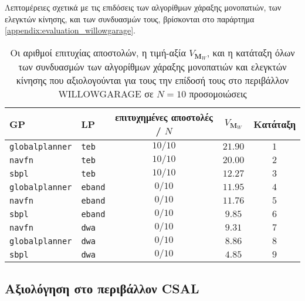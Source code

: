 Λεπτομέρειες σχετικά
με τις επιδόσεις των αλγορίθμων χάραξης μονοπατιών, των ελεγκτών κίνησης,
και των συνδυασμών τους, βρίσκονται στο παράρτημα
\ref{appendix:evaluation_willowgarage}.


\begin{table}[htb]\centering
\renewcommand{\arraystretch}{1.3}
\begin{tabular}{llccc}
  GP                     & LP             & επιτυχημένες αποστολές / $N$ & $V_{\bm{M}_W}$ & Κατάταξη \\ \toprule
  \texttt{globalplanner} & \texttt{teb}   & $10/10$                      & $21.90$        & $1$      \\
  \texttt{navfn}         & \texttt{teb}   & $10/10$                      & $20.00$        & $2$      \\
  \texttt{sbpl}          & \texttt{teb}   & $10/10$                      & $12.27$        & $3$      \\
  \texttt{globalplanner} & \texttt{eband} & $0/10$                       & $11.95$        & $4$      \\
  \texttt{navfn}         & \texttt{eband} & $0/10$                       & $11.76$        & $5$      \\
  \texttt{sbpl}          & \texttt{eband} & $0/10$                       & $9.85$         & $6$      \\
  \texttt{navfn}         & \texttt{dwa}   & $0/10$                       & $9.31$         & $7$      \\
  \texttt{globalplanner} & \texttt{dwa}   & $0/10$                       & $8.86$         & $8$      \\
  \texttt{sbpl}          & \texttt{dwa}   & $0/10$                       & $4.85$         & $9$      \\ \bottomrule
\end{tabular}
\caption{\small Οι αριθμοί επιτυχίας αποστολών, η τιμή-αξία $V_{\bm{M}_W}$, και
         η κατάταξη όλων των συνδυασμών των αλγορίθμων χάραξης μονοπατιών και
         ελεγκτών κίνησης που αξιολογούνται για τους την επίδοσή τους στο
         περιβάλλον WILLOWGARAGE σε $N=10$ προσομοιώσεις}
\label{tbl:rank_willowgarage}
\end{table}



\subsection{Αξιολόγηση στο περιβάλλον CSAL}
  \label{subsection:02_01_04:04}

